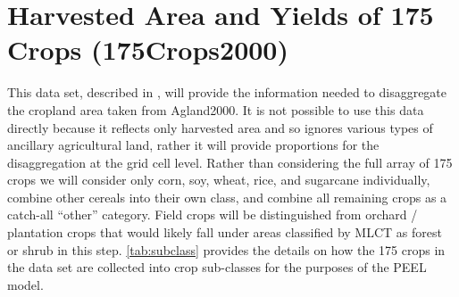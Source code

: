 \clearpage

\section{Harvested Area and Yields of 175 Crops (175Crops2000)}
\label{sec:175crops2000}





This data set, described in \citet{Monfreda2008}, will provide the
information needed to disaggregate the cropland area taken from
Agland2000.  It is not possible to use this data directly because it
reflects only harvested area and so ignores various types of ancillary
agricultural land, rather it will provide proportions for the
disaggregation at the grid cell level.  Rather than considering the
full array of 175 crops we will consider only corn, soy, wheat, rice,
and sugarcane individually, combine other cereals into their own
class, and combine all remaining crops as a catch-all ``other''
category.  Field crops will be distinguished from orchard / plantation
crops that would likely fall under areas classified by MLCT as forest
or shrub in this step. \autoref{tab:subclass} provides the details on how the 175 crops in the \citet{Monfreda2008} data set are collected into crop sub-classes for the purposes of the PEEL model.





